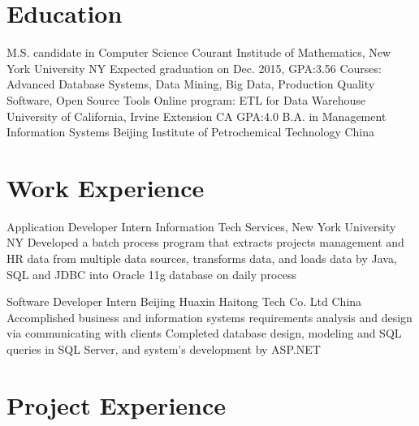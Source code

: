 \documentclass[11pt,a4paper,sans]{moderncv}   %
\begin{document}
\maketitle

\section{Education}
{M.S. candidate in Computer Science}
{Courant Institude of Mathematics, New York University}
{NY}
{Expected graduation on Dec. 2015, GPA:3.56}
{Courses: Advanced Database Systems, Data Mining, Big Data, Production Quality Software, Open Source Tools}
{Online program: ETL for Data Warehouse}
{University of California, Irvine Extension}
{CA}
{GPA:4.0}
{}
{B.A. in Management Information Systems}
{Beijing Institute of Petrochemical Technology}
{China}
{}{}


\section{Work Experience}
\renewcommand{\baselinestretch}{1.0}

{Application Developer Intern}
{}
{Information Tech Services, New York University}
{NY}
{{Developed a batch process program that extracts projects management and HR data from multiple data sources, transforms data, and loads data by Java, SQL and JDBC into Oracle 11g database on daily process}
}


{Software Developer Intern}
{}
{Beijing Huaxin Haitong Tech Co. Ltd}
{China}
{{Accomplished business and information systems requirements analysis and design via communicating with clients}
\newline
{Completed database design, modeling and SQL queries in SQL Server, and system’s development by ASP.NET}}



\section{Project Experience}
\renewcommand{\baselinestretch}{1.0}
\end{document}
